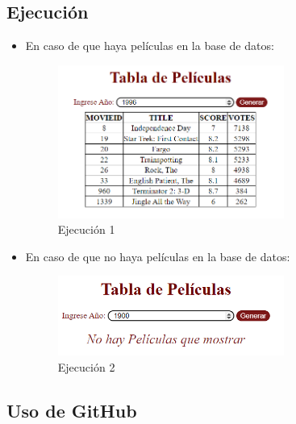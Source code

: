\documentclass{article}
\begin{document}
  \subsection{Ejecución}
  \begin{itemize}
    \item En caso de que haya películas en la base de datos:
    \begin{figure}[H]
      \centering
      \includegraphics[width=0.7\textwidth, keepaspectratio]{img/existe.png}
      \caption{Ejecución 1}
    \end{figure}
    \item En caso de que no haya películas en la base de datos:
    \begin{figure}[H]
      \centering
      \includegraphics[width=0.7\textwidth, keepaspectratio]{img/noexiste.png}
      \caption{Ejecución 2}
    \end{figure}
  \end{itemize}
  \newpage

	
  \subsection{Uso de GitHub}
  
\end{document}
